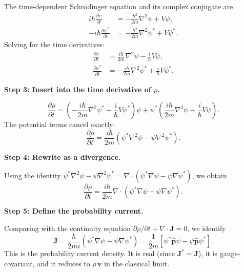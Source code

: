 The time-dependent Schr\"{o}dinger equation and its complex conjugate are
\begin{align}
i\hbar\frac{\partial\psi}{\partial t} &= -\frac{\hbar^2}{2m}\nabla^2\psi + V\psi, \\
-i\hbar\frac{\partial\psi^*}{\partial t} &= -\frac{\hbar^2}{2m}\nabla^2\psi^* + V\psi^*.
\end{align}
Solving for the time derivatives:
\begin{align}
\frac{\partial\psi}{\partial t} &= \frac{i\hbar}{2m}\nabla^2\psi - \frac{i}{\hbar}V\psi, \\
\frac{\partial\psi^*}{\partial t} &= -\frac{i\hbar}{2m}\nabla^2\psi^* + \frac{i}{\hbar}V\psi^*.
\end{align}

\textbf{Step 3: Insert into the time derivative of $\rho$.}

\begin{equation}
\frac{\partial\rho}{\partial t} = \left(-\frac{i\hbar}{2m}\nabla^2\psi^* + \frac{i}{\hbar}V\psi^*\right)\psi + \psi^*\left(\frac{i\hbar}{2m}\nabla^2\psi - \frac{i}{\hbar}V\psi\right).
\end{equation}
The potential terms cancel exactly:
\begin{equation}
\frac{\partial\rho}{\partial t} = \frac{i\hbar}{2m}\left(\psi^*\nabla^2\psi - \psi\nabla^2\psi^*\right).
\end{equation}

\textbf{Step 4: Rewrite as a divergence.}

Using the identity $\psi^*\nabla^2\psi - \psi\nabla^2\psi^* = \nabla\cdot(\psi^*\nabla\psi - \psi\nabla\psi^*)$, we obtain
\begin{equation}
\frac{\partial\rho}{\partial t} = \frac{i\hbar}{2m}\nabla\cdot\left(\psi^*\nabla\psi - \psi\nabla\psi^*\right).
\end{equation}

\textbf{Step 5: Define the probability current.}

Comparing with the continuity equation $\partial\rho/\partial t + \nabla\cdot\mathbf{J} = 0$, we identify
\begin{equation}
\boxed{\mathbf{J} = \frac{\hbar}{2mi}\left(\psi^*\nabla\psi - \psi\nabla\psi^*\right) = \frac{1}{2m}\left[\psi^*\hat{\mathbf{p}}\psi - \psi\hat{\mathbf{p}}\psi^*\right].}
\end{equation}
This is the probability current density. It is real (since $\mathbf{J}^* = \mathbf{J}$), it is gauge-covariant, and it reduces to $\rho\,\mathbf{v}$ in the classical limit.

